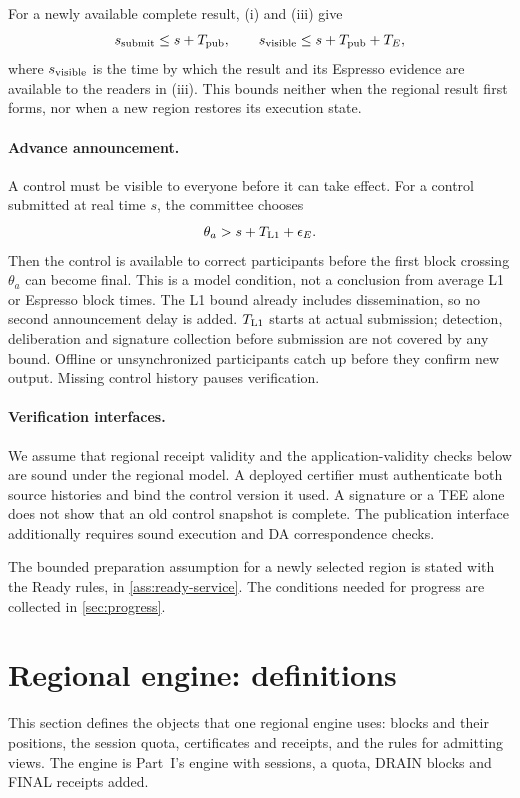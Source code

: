\documentclass[11pt,a4paper]{article}
\begin{document}
For a newly available complete result, (i) and (iii) give
\[
 s_{\rm submit}\le s+T_{\rm pub},\qquad
 s_{\rm visible}\le s+T_{\rm pub}+T_E,
\]
where $s_{\rm visible}$ is the time by which the result and its Espresso
evidence are available to the readers in (iii). This bounds neither when
the regional result first forms, nor when a new region restores its
execution state.

\paragraph{Advance announcement.}
A control must be visible to everyone before it can take effect.
For a control submitted at real time $s$, the committee chooses
\[
 \theta_a>s+T_{\rm L1}+\epsilon_E.
\]
Then the control is available to correct participants before the first
block crossing $\theta_a$ can become final. This is a model condition,
not a conclusion from average L1 or Espresso block times. The L1 bound
already includes dissemination, so no second announcement delay is
added. $T_{\rm L1}$ starts at actual submission; detection, deliberation
and signature collection before submission are not covered by any
bound. Offline or unsynchronized participants catch up before they
confirm new output. Missing control history pauses verification.

\paragraph{Verification interfaces.}
We assume that regional receipt validity and the application-validity
checks below are sound under the regional model. A deployed certifier
must authenticate both source histories and bind the control version it
used. A signature or a TEE alone does not show that an old control
snapshot is complete. The publication interface additionally requires
sound execution and DA correspondence checks.

The bounded preparation assumption for a newly selected region is
stated with the Ready rules, in \cref{ass:ready-service}. The conditions
needed for progress are collected in \cref{sec:progress}.

\section{Regional engine: definitions}
\label{sec:regional}
This section defines the objects that one regional engine uses: blocks
and their positions, the session quota, certificates and receipts, and
the rules for admitting views. The engine is Part~I's engine with
sessions, a quota, DRAIN blocks and FINAL receipts added.
\end{document}
